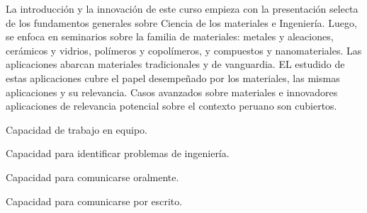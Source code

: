 \begin{syllabus}


\begin{justification}
La introducción y la innovación de este curso empieza con la presentación selecta de los fundamentos generales sobre Ciencia de los materiales e Ingeniería.
Luego, se enfoca en seminarios sobre la familia de materiales: metales y aleaciones, cerámicos y vidrios, polímeros y copolímeros, y compuestos y nanomateriales.
Las aplicaciones abarcan materiales tradicionales y de vanguardia. EL estudido de estas aplicaciones cubre el papel desempeñado por los materiales, 
las mismas aplicaciones y su relevancia. Casos avanzados sobre materiales e innovadores aplicaciones de relevancia potencial sobre el contexto peruano son cubiertos.

\end{justification}

\begin{goals}
\item Capacidad de trabajo en equipo.
\item Capacidad para identificar problemas de ingeniería.
\item Capacidad para comunicarse oralmente.
\item Capacidad para comunicarse por escrito.
\end{goals}

\begin{outcomes}
    \item {}
    \item {}
\end{outcomes}

\begin{competences}
    \item {}
\end{competences}


\end{syllabus}
